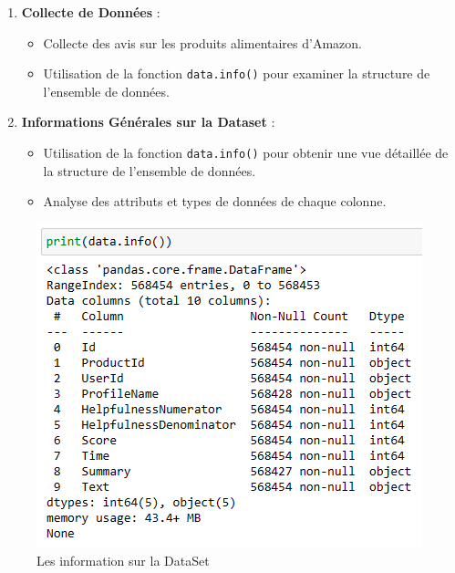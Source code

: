 \begin{frame}
    \begin{enumerate}
        \item \textbf{Collecte de Données} :
            \begin{itemize}
                \item Collecte des avis sur les produits alimentaires d'Amazon.
                \item Utilisation de la fonction \texttt{data.info()} pour examiner la structure de l'ensemble de données.
            \end{itemize}
        \item \textbf{Informations Générales sur la Dataset} :
            \begin{itemize}
                \item Utilisation de la fonction \texttt{data.info()} pour obtenir une vue détaillée de la structure de l'ensemble de données.
                \item Analyse des attributs et types de données de chaque colonne.
            \end{itemize}
    \end{enumerate}
    \begin{figure}[h]
    \centering
    \includegraphics[scale=0.35]{Figures/datainfo.PNG}
    \caption{Les information sur la DataSet}
    \label{fig:dataframeinfo}
\end{figure}
\end{frame}


